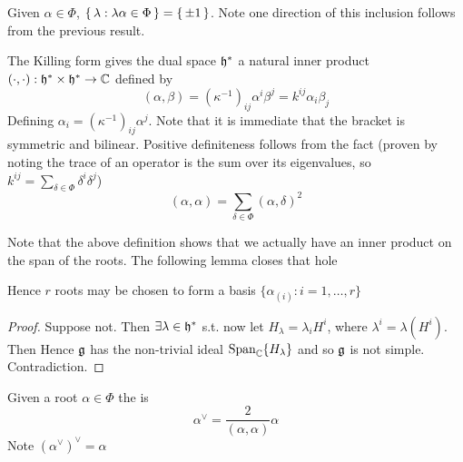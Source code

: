 \documentclass{article}
\begin{document}
\begin{fact}
Given $\alpha\in\Phi$, $\set{  \lambda : \lambda\alpha\in\Phi  } = \set{  \pm1  }$. Note one direction of this inclusion follows from the previous result. 
\end{fact}

\begin{definition}
The Killing form gives the dual space $\mathfrak{h}^\ast$ a natural inner product $(\cdot,\cdot):\mathfrak{h}^\ast \times \mathfrak{h}^\ast \to \mathbb{C}$ defined by 
\[
(\alpha, \beta) = \left(\kappa^{-1}\right)_{ij} \alpha^i \beta^j = k^{ij} \alpha_i \beta_j
\]
Defining $\alpha_i=\left( \kappa^{-1} \right)_{ij} \alpha^j$. Note that it is immediate that the bracket is symmetric and bilinear. Positive definiteness follows from the fact
\eq{
(\alpha,\beta) = \sum_{\delta \in \Phi} (\alpha,\delta) (\beta,\delta)
}
(proven by noting the trace of an operator is the sum over its eigenvalues, so $k^{ij} = \sum_{\delta \in \Phi} \delta^i \delta^j$)
\[
(\alpha, \alpha)=\sum_{\delta\in\Phi} (\alpha, \delta)^2
\]
\end{definition}

Note that the above definition shows that we actually have an inner product on the span of the roots. The following lemma closes that hole 
\begin{lemma}
Hence $r$ roots may be chosen to form a basis $\{ \alpha_{(i)} : i=1,\dots,r \}$
\end{lemma}
\begin{proof}
Suppose not. Then $\exists \lambda \in \mathfrak{h}^\ast$ s.t. 
now let $H_\lambda = \lambda_i H^i $, where $\lambda^i = \lambda (H^i)$. Then 
Hence $\mathfrak{g}$ has the non-trivial ideal $\operatorname{Span}_{\mathbb{C}} \{H_{\lambda}\}$ and so $\mathfrak{g}$ is not simple. Contradiction. 
\end{proof}

\begin{definition}[Coroots]
Given a root $\alpha\in\Phi$ the  is 
\[
\alpha^\vee=\frac{2}{(\alpha,\alpha)}\alpha
\]
Note $\left( \alpha^\vee \right)^\vee=\alpha$
\end{definition}
\end{document}

